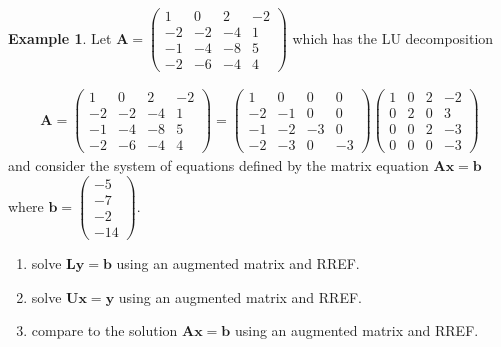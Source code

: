 \documentclass[
]{book}
\theoremstyle{definition}
\theoremstyle{definition}
\newtheorem{example}{Example}[chapter]
\theoremstyle{definition}
\theoremstyle{definition}
\theoremstyle{remark}
\begin{document}
\begin{example}

Let \(\mathbf{A} = \begin{pmatrix} 1 & 0 & 2 & -2 \\ -2 & -2 & -4 & 1 \\ -1 & -4 & -8 & 5 \\ -2 & -6 & -4 & 4 \end{pmatrix}\) which has the LU decomposition

\[
\begin{aligned}
\mathbf{A} = \begin{pmatrix} 1 & 0 & 2 & -2 \\ -2 & -2 & -4 & 1 \\ -1 & -4 & -8 & 5 \\ -2 & -6 & -4 & 4 \end{pmatrix} = \begin{pmatrix} 1 & 0 & 0 & 0 \\ -2 & -1 & 0 & 0 \\ -1 & -2 & -3 & 0 \\ -2 & -3 & 0 & -3 \end{pmatrix} \begin{pmatrix} 1 & 0 & 2 & -2 \\ 0 & 2 & 0 & 3 \\ 0 & 0 & 2 & -3 \\ 0 & 0 & 0 & -3 \end{pmatrix}
\end{aligned}
\]
and consider the system of equations defined by the matrix equation \(\mathbf{A} \mathbf{x} = \mathbf{b}\) where \(\mathbf{b} = \begin{pmatrix} -5 \\ -7 \\ -2 \\ -14 \end{pmatrix}\).

\begin{enumerate}
\def\labelenumi{\arabic{enumi})}
\item
  solve \(\mathbf{L} \mathbf{y} = \mathbf{b}\) using an augmented matrix and RREF.
\item
  solve \(\mathbf{U} \mathbf{x} = \mathbf{y}\) using an augmented matrix and RREF.
\item
  compare to the solution \(\mathbf{A}\mathbf{x} = \mathbf{b}\) using an augmented matrix and RREF.
\end{enumerate}

\end{example}
\end{document}
